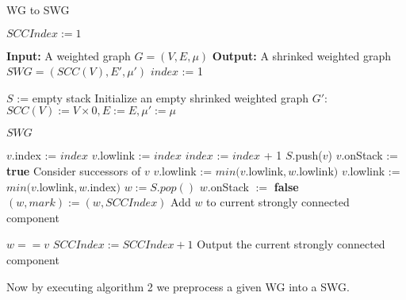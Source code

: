 \documentclass{article}
\begin{document}
\begin{algorithm}
	\caption{WG to SWG}
	\begin{algorithmic}[1]
	\State $SCCIndex := 1$
		
		\State\textbf{Input:} A weighted graph $G = (V,E,\mu)$
		\State\textbf{Output:} A shrinked weighted graph $SWG = (SCC(V), E', \mu')$	
		\State 
		\State $index$ := 1
		
		\State $S$ := empty stack
		\State Initialize  an empty shrinked weighted graph $G'$: 
		\State $SCC(V) := V\times {0}, E:=E, \mu' := \mu$
			
		\State  
				\State {}
			\EndIf
		\EndFor
		\State\Return $SWG$
		\EndFunction
		
		\State
			\State $v.$index := $index$
			\State $v$.lowlink := $index$
			\State $index$ := $index$ + 1
			\State $S$.push($v$)
			\State $v$.onStack := \textbf{true}
			\State			
			\State \Comment Consider successors of $v$
					\State{}
					\State $v$.lowlink := $min(v$.lowlink$, w$.lowlink$ )$ 
					\State $v$.lowlink := $min(v$.lowlink$, w. $index$)$ 
				\EndIf
			\EndFor
			\State
				\Repeat
					\State $w := S.pop()$					
					\State $w$.onStack $:= $ \textbf{false}
					\State $(w, mark) := (w, SCCIndex)$
					\State \Comment Add $w$ to current strongly connected component 
				
				
				\Until
				$w == v$
				\State $SCCIndex := SCCIndex + 1$ 
				\State\Comment Output the current strongly connected component
			\EndIf
		\EndFunction
	\end{algorithmic}

\end{algorithm}
 
Now by executing algorithm 2 we preprocess a given WG into a SWG.
\end{document}
